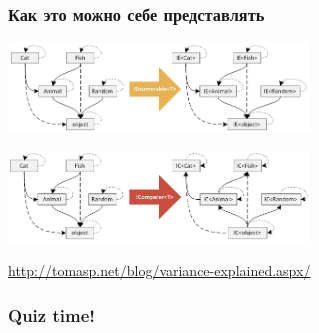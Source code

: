 \documentclass[xetex,mathserif,serif]{beamer}
\begin{document}
    \begin{frame}
        \frametitle{Как это можно себе представлять}
        \begin{center}
            \includegraphics[width=0.6\textwidth]{covariantFunctors.png}

            \vspace{4mm}
            \includegraphics[width=0.6\textwidth]{contravariantFunctors.png}
        \end{center}
            
        \url{http://tomasp.net/blog/variance-explained.aspx/}
    \end{frame}

    \begin{frame}
        \frametitle{Quiz time!}
    \end{frame}
\end{document}
